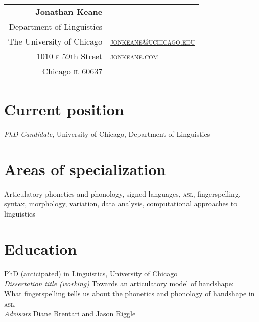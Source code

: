 \documentclass[10pt, letterpaper]{article}
\newcommand{\years}[1]{\marginpar{\scriptsize #1}}
\begin{document}
\thispagestyle{empty} %
\reversemarginpar
\raggedright

\begin{table}[!t]
  \begin{tabular*}{6.5in}{r|l}
    \hspace{3in}\textbf{\LARGE\sffamily Jonathan Keane}  &\\
Department of Linguistics & \\
  The University of Chicago & \href{mailto:jonkeane@uchicago.edu}{\textsc{jonkeane@uchicago.edu}}\\
1010 \textsc{e} 59th Street & \href{http://jonkeane.com}{\textsc{jonkeane.com}}\\
    Chicago \textsc{il} 60637 & \\
  \end{tabular*}
\end{table}
\setlength\parindent{0in}
\setlength\parskip{0ex}
\section*{Current position}
\emph{PhD Candidate}, University of Chicago, Department of Linguistics\\

\section*{Areas of specialization}
Articulatory phonetics and phonology, signed languages, \textsc{asl}, fingerspelling, syntax, morphology, variation, data analysis, computational approaches to linguistics


\section*{Education}
\-\years{2014}PhD (anticipated) in Linguistics, University of Chicago \\
\hspace{2em} \textit{Dissertation title (working)} Towards an articulatory model of handshape:\\
\hspace{4em}What fingerspelling tells us about the phonetics and phonology of handshape in \textsc{asl}.\\
\hspace{2em} \textit{Advisors} Diane Brentari and Jason Riggle
\end{document}
